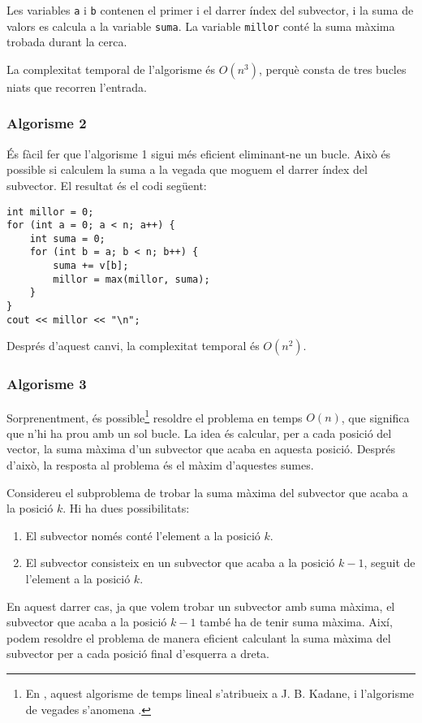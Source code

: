 Les variables \texttt{a} i \texttt{b} contenen el primer i
el darrer índex del subvector,
i la suma de valors es calcula a la variable \texttt{suma}.
La variable \texttt{millor} conté la suma màxima trobada
durant la cerca.

La complexitat temporal de l'algorisme és $O(n^3)$,
perquè consta de tres bucles niats
que recorren l'entrada.

\subsubsection{Algorisme 2}

És fàcil fer que l'algorisme 1 sigui més eficient
eliminant-ne un bucle.
Això és possible si calculem la suma a la vegada que moguem
el darrer índex del subvector.
El resultat és el codi següent:

\begin{lstlisting}
int millor = 0;
for (int a = 0; a < n; a++) {
    int suma = 0;
    for (int b = a; b < n; b++) {
        suma += v[b];
        millor = max(millor, suma);
    }
}
cout << millor << "\n";
\end{lstlisting}
Després d'aquest canvi, la complexitat temporal és $O(n^2)$.

\subsubsection{Algorisme 3}

Sorprenentment, és possible\footnote{En \cite{ben86}, aquest algorisme de
temps lineal s'atribueix a J. B. Kadane, i l'algorisme de
vegades s'anomena 
.} resoldre el problema
en temps $O(n)$, que significa que n'hi ha prou amb un sol bucle.
La idea és calcular, per a cada posició del vector,
la suma màxima d'un subvector que acaba en aquesta posició.
Després d'això, la resposta al problema és el
màxim d'aquestes sumes.

Considereu el subproblema de trobar la suma màxima del
subvector que acaba a la posició $k$.
Hi ha dues possibilitats:
\begin{enumerate}
\item El subvector només conté l'element a la posició $k$.
\item El subvector consisteix en un subvector que acaba
a la posició $k-1$, seguit de l'element a la posició $k$.
\end{enumerate}

En aquest darrer cas, ja que volem
trobar un subvector amb suma màxima,
el subvector que acaba a la posició $k-1$
també ha de tenir suma màxima.
Així, podem resoldre el problema de manera eficient
calculant la suma màxima del subvector
per a cada posició final d'esquerra a dreta.

